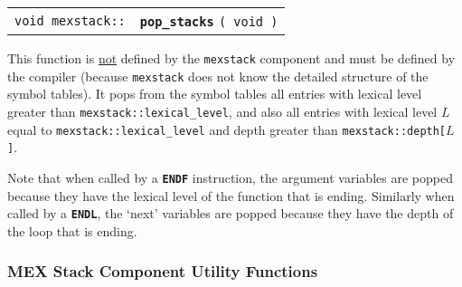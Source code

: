 \documentclass[12pt]{article}
\makeatletter
\newcommand{\TT}[1]{{\tt \bfseries #1}}
\newcommand{\ttindex}[1]{\index{#1@{\tt #1}}}
\newcommand{\EOL}{\penalty \exhyphenpenalty}
\newenvironment{indpar}[1][0.3in]%
	{\begin{list}{}%
		     {\setlength{\itemsep}{0in}%
		      \setlength{\topsep}{0in}%
		      \setlength{\parsep}{1ex}%
		      \setlength{\labelwidth}{#1}%
		      \setlength{\leftmargin}{#1}%
		      \addtolength{\leftmargin}{\labelsep}}%
	 \item}%
	{\end{list}}
\newcommand{\MEXSTACKKEY}[1]%
	   {\TT{#1}\ttindex{mexstack::#1}\ttindex{#1}}
\makeatother
\begin{document}
\begin{tabular}{@{}r@{~~~}l}
\verb|void mexstack::| & \MEXSTACKKEY{pop\_stacks} {\tt ( void )}
\end{tabular}
\begin{indpar}
This function is \underline{not} defined by the {\tt mexstack} component
and must be defined by the compiler (because {\tt mexstack} does not
know the detailed structure of the symbol tables).
It pops from the symbol
tables all entries with lexical level greater than
{\tt mexstack::\EOL lexical\_\EOL level}, and 
also all entries with lexical level $L$ equal to
{\tt mexstack::\EOL lexical\_\EOL level} and 
depth greater than {\tt mexstack::\EOL depth[$L$]}.

Note that when called by a \TT{ENDF} instruction, the argument
variables are popped because they have the lexical level of
the function that is ending.  Similarly when called by a \TT{ENDL},
the `next' variables are popped because they have the depth of the
loop that is ending.
\end{indpar}

\subsubsection{MEX Stack Component Utility Functions}
\label{MEX-STACK-COMPONENT-UTILITY-FUNCTIONS}
\end{document}
